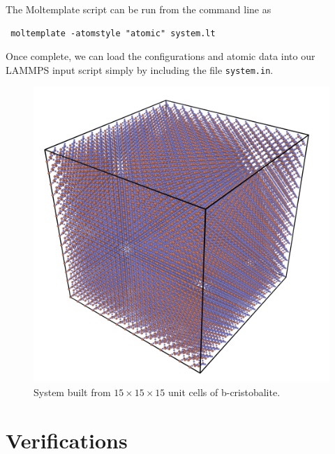 \documentclass[twoside,english]{uiofysmaster}
\begin{document}
The Moltemplate script can be run from the command line as
 \begin{lstlisting}
 moltemplate -atomstyle "atomic" system.lt
 \end{lstlisting}
Once complete, we can load the configurations and atomic data into our LAMMPS input script simply by including the file \texttt{system.in}.



\begin{figure}[H]
	\centering
	\includegraphics[width=0.7\linewidth]{figures/CreatingSystem/hugeCube}
	\caption{System built from $15\times15\times15$ unit cells of b-cristobalite.}
	\label{fig:hugeCube}
\end{figure}


\section{Verifications}
\end{document}
